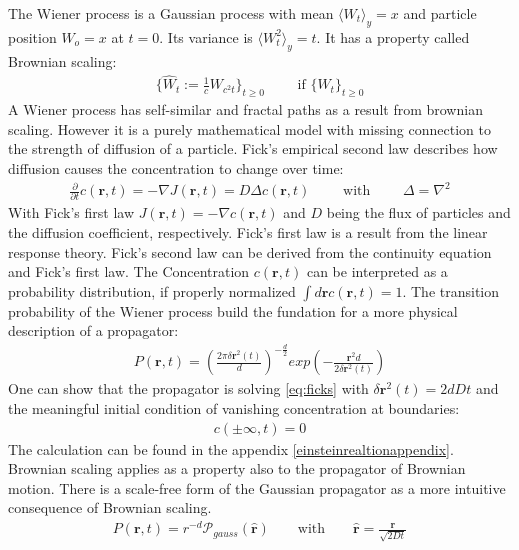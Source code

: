 \documentclass[
  a4paper,BCOR10mm,oneside,
  bibtotoc,idxtotoc,
  headsepline,footsepline,%
  fleqn,openbib
]{scrbook}
\begin{document}
The Wiener process is a Gaussian process with mean $\langle W_t \rangle_y=x$ and particle position $W_o=x$ at $t=0$. Its variance is $\langle W^2_t \rangle_y= t$. It has a property called Brownian scaling:
\begin{align}
\label{Brownianscaling}
\{\hat{W}_t := \frac{1}{c} W_{c^2 t} \}_{t\geq0} \qquad  \text{ if } \{W_t\}_{t \geq 0}
\end{align}
A Wiener process has self-similar and fractal paths as a result from brownian scaling.\newline 
However it is a purely mathematical model with missing connection to the strength of diffusion of a particle. Fick's empirical second law describes how diffusion causes the concentration to change over time:
\begin{align}
 \frac{\partial}{\partial t} c(\bm{r},t) = - \nabla J (\bm{r},t) = D  \Delta c(\bm{r},t) \qquad \text{ with } \qquad \Delta= \nabla^2  \label{eq:ficks}
\end{align}
With Fick's first law $J(\bm{r},t)=- \nabla c(\bm{r},t)$ and $D$ being the flux of particles and the diffusion coefficient, respectively. Fick's first law is a result from the linear response theory. Fick's second law can be derived from the continuity equation and Fick's first law. The Concentration $c(\bm{r},t)$ can be interpreted as a probability distribution, if properly normalized  $\int d\bm{r} c(\bm{r},t)=1$. The transition probability of the Wiener process build the fundation for a more physical description of a propagator:
\begin{align}
 P(\bm{r},t)=  \left(\frac{2 \pi \delta \bm{r}^2(t)}{d}\right)^{- \frac{d}{2}} exp \left(- \frac{\bm{r}^2 d}{2 \delta \bm{r}^2(t)} \right) \label{propagator}
\end{align}
One can show that the propagator is solving \cref{eq:ficks} with $\delta \bm{r}^2(t)=2dDt$ and the meaningful initial condition of vanishing concentration at boundaries: 
\begin{align}
c(\pm \infty,t)=0
\end{align}
The calculation can be found in the appendix \ref{einsteinrealtionappendix}.
Brownian scaling applies as a property also to the propagator of Brownian motion.
There is a scale-free form of the Gaussian propagator as a more intuitive consequence of Brownian scaling. 
\begin{align}
P(\bm{r},t)= r^{-d} \mathcal{P}_{gauss}(\hat{\bm{r}})  \qquad \text{with} \qquad \hat{\bm{r}} = \frac{\bm{r}}{\sqrt{2Dt}} \label{scalefreeform}
\end{align}
\end{document}
